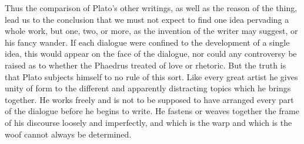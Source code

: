 \documentclass[11pt,letter]{article}
\begin{document}
\par  Thus the comparison of Plato's other writings, as well as the reason of the thing, lead us to the conclusion that we must not expect to find one idea pervading a whole work, but one, two, or more, as the invention of the writer may suggest, or his fancy wander. If each dialogue were confined to the development of a single idea, this would appear on the face of the dialogue, nor could any controversy be raised as to whether the Phaedrus treated of love or rhetoric. But the truth is that Plato subjects himself to no rule of this sort. Like every great artist he gives unity of form to the different and apparently distracting topics which he brings together. He works freely and is not to be supposed to have arranged every part of the dialogue before he begins to write. He fastens or weaves together the frame of his discourse loosely and imperfectly, and which is the warp and which is the woof cannot always be determined.
\end{document}
